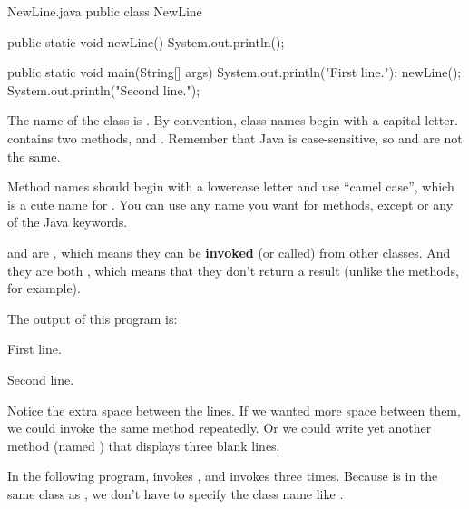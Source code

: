 
\begin{trinket}[310]{NewLine.java}
public class NewLine {

    public static void newLine() {
        System.out.println();
    }

    public static void main(String[] args) {
        System.out.println("First line.");
        newLine();
        System.out.println("Second line.");
    }
}
\end{trinket}


The name of the class is .
By convention, class names begin with a capital letter.
 contains two methods,  and .
Remember that Java is case-sensitive, so  and  are not the same.


Method names should begin with a lowercase letter and use ``camel case'', which is a cute name for .
You can use any name you want for methods, except  or any of the Java keywords.


 and  are , which means they can be {\bf invoked} (or called) from other classes.
And they are both , which means that they don't return a result (unlike the  methods, for example).

The output of this program is:

\begin{stdout}
First line.

Second line.
\end{stdout}

Notice the extra space between the lines.
If we wanted more space between them, we could invoke the same method repeatedly.
Or we could write yet another method (named ) that displays three blank lines.

In the following program,  invokes , and  invokes  three times.
Because  is in the same class as , we don't have to specify the class name like .


